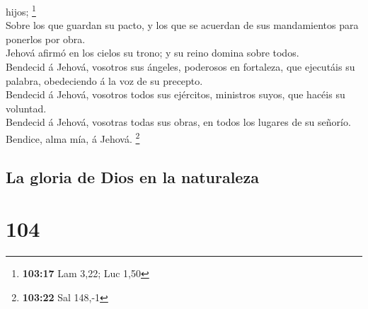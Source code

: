 hijos; \footnote{\textbf{103:17} Lam 3,22; Luc 1,50}\\
 Sobre los que guardan su pacto, y los que se acuerdan de
sus mandamientos para ponerlos por obra.\\
 Jehová afirmó en los cielos su trono; y su reino domina
sobre todos.\\
 Bendecid á Jehová, vosotros sus ángeles, poderosos en
fortaleza, que ejecutáis su palabra, obedeciendo á la voz de su
precepto.\\
 Bendecid á Jehová, vosotros todos sus ejércitos,
ministros suyos, que hacéis su voluntad.\\
 Bendecid á Jehová, vosotras todas sus obras, en todos
los lugares de su señorío. Bendice, alma mía, á Jehová. \footnote{\textbf{103:22}
  Sal 148,-1}

\hypertarget{la-gloria-de-dios-en-la-naturaleza}{%
\subsection{La gloria de Dios en la
naturaleza}\label{la-gloria-de-dios-en-la-naturaleza}}

\hypertarget{section-103}{%
\section{104}\label{section-103}}

